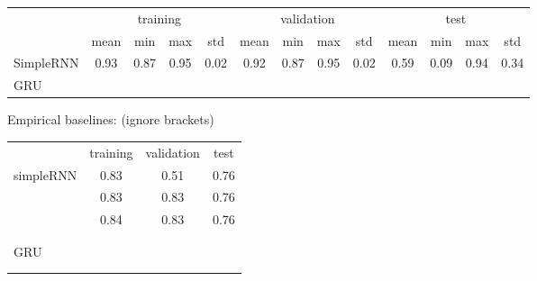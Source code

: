 \documentclass{article}
\begin{document}
\begin{table}[!h]
\begin{tabular}{l|cccc|cccc|cccc}
            & \multicolumn{4}{c}{training} & \multicolumn{4}{c}{validation} & \multicolumn{4}{c}{test}\\
            & mean & min & max & std & mean & min & max & std & mean & min & max & std \\ 
\hline
SimpleRNN   & 0.93 & 0.87 & 0.95 & 0.02 & 0.92 & 0.87 & 0.95 & 0.02 & 0.59 & 0.09 & 0.94 & 0.34\\ 
GRU & 
\end{tabular}
\end{table}

Empirical baselines: (ignore brackets)

\begin{tabular}{lccc}
    & training & validation & test\\
simpleRNN & 0.83 & 0.51 & 0.76\\
& 0.83 & 0.83 & 0.76\\
& 0.84 & 0.83 & 0.76\\
\\
\\
GRU &\\
\\
\\
\end{tabular}
\end{document}
